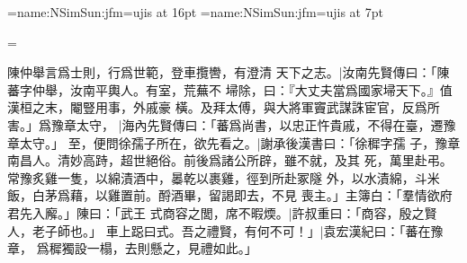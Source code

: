 
\jfont\Song={name:NSimSun:jfm=ujis} at 16pt
\jfont\smallSong={name:NSimSun:jfm=ujis} at 7pt


\zmh@depth=8pt
\guji@everytwolinemode={\smallSong\baselineskip=8pt\zmh@depth=4pt}
\guji@twolineraise=0pt

\Song

\guji

\vskip 5pt

陳仲舉言爲士則，行爲世範，登車攬轡，有澄清
天下之志。|{汝南先賢傳⽈：「陳蕃字仲舉，汝南平輿⼈。有室，荒蕪不
埽除，⽈：『⼤丈夫當爲國家埽天下。』值漢桓之末，閹豎⽤事，外戚豪
橫。及拜太傅，與⼤將軍竇武謀誅宦官，反爲所害。」}爲豫章太守，
|{海內先賢傳⽈：「蕃爲尚書，以忠正忤貴戚，不得在臺，遷豫章太守。」}
至，便問徐孺子所在，欲先看之。|{謝承後漢書⽈：「徐穉字孺
⼦，豫章南昌⼈。清妙⾼跱，超世絕俗。前後爲諸公所辟，雖不就，及其
死，萬⾥赴弔。常豫炙雞⼀隻，以綿漬酒中，㬥乾以裹雞，徑到所赴冢隧
外，以⽔漬綿，⽃⽶飯，⽩茅爲藉，以雞置前。酹酒畢，留謁即去，不⾒
喪主。」}主簿白：「羣情欲府君先入廨。」陳曰：「武王
式商容之閭，席不暇煗。|{許叔重⽈：「商容，殷之賢⼈，⽼⼦師也。」
⾞上跽⽈式。}吾之禮賢，有何不可！」|{袁宏漢紀⽈：「蕃在豫章，
爲穉獨設⼀榻，去則懸之，⾒禮如此。」}
\endguji
\bye
